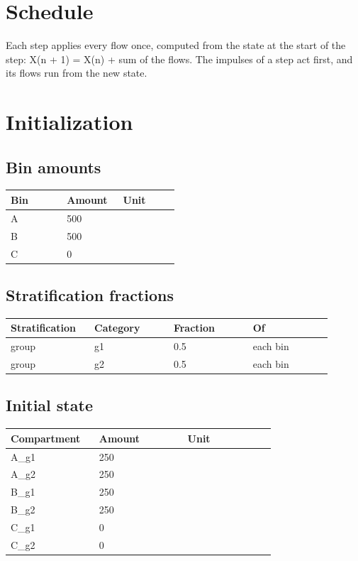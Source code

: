 \documentclass{article}
\begin{document}
\section*{Schedule}
Each step applies every flow once, computed from the state at the start of the step: X(n + 1) = X(n) + sum of the flows. The impulses of a step act first, and its flows run from the new state.

\section*{Initialization}
\subsection*{Bin amounts}
\begin{longtable}{p{0.3\linewidth}p{0.3\linewidth}p{0.3\linewidth}}
Bin & Amount & Unit \\
\hline
\endhead
A & 500 &  \\
B & 500 &  \\
C & 0 &  \\
\end{longtable}
\subsection*{Stratification fractions}
\begin{longtable}{p{0.225\linewidth}p{0.225\linewidth}p{0.225\linewidth}p{0.225\linewidth}}
Stratification & Category & Fraction & Of \\
\hline
\endhead
group & g1 & 0.5 & each bin \\
group & g2 & 0.5 & each bin \\
\end{longtable}
\subsection*{Initial state}
\begin{longtable}{p{0.3\linewidth}p{0.3\linewidth}p{0.3\linewidth}}
Compartment & Amount & Unit \\
\hline
\endhead
A\_g1 & 250 &  \\
A\_g2 & 250 &  \\
B\_g1 & 250 &  \\
B\_g2 & 250 &  \\
C\_g1 & 0 &  \\
C\_g2 & 0 &  \\
\end{longtable}
\end{document}

